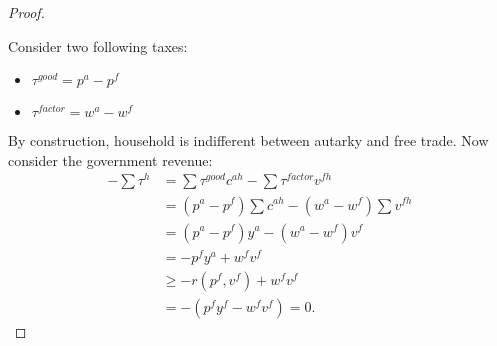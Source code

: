 \begin{proof}
    \

    Consider two following taxes:
    \begin{itemize}
        \item $\tau ^{good} = p^a - p^f$
        \item $\tau ^{factor} = w^a - w^f$
    \end{itemize}
    By construction, household is indifferent between autarky and free trade.
    Now consider the government revenue:
    \begin{align*}
        - \sum \tau ^h &= \sum \tau ^{good} c^{ah} - \sum \tau ^{factor} v^{fh} \\ 
        &= (p^a - p^f) \sum c^{ah} - (w^a - w^f) \sum v^{fh} \\
        &= (p^a - p^f) y^a - (w^a - w^f) v^f \\
        &= -p^f y^a + w^f v^f \\
        & \geq -r(p^f, v^f) + w^f v^f \\
        &= -(p^f y^f - w^f v^f) = 0.
    \end{align*}
\end{proof}